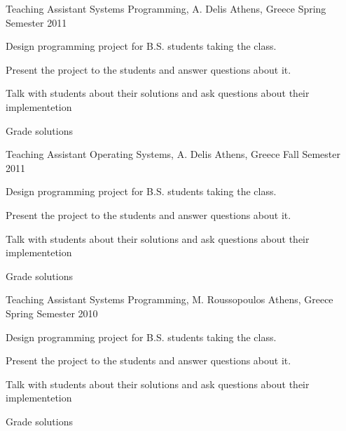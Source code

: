 

\begin{cventries}

  \cventry
    {Teaching Assistant} %
    {Systems Programming, A. Delis} %
    {Athens, Greece} %
    {Spring Semester 2011} %
    {
      \begin{cvitems} %
        \item {Design programming project for B.S. students taking the class.}
        \item {Present the project to the students and answer questions about it.}
        \item {Talk with students about their solutions and ask questions about their implementetion}
		\item {Grade solutions}
      \end{cvitems}
    }

  \cventry
    {Teaching Assistant} %
    {Operating Systems, A. Delis} %
    {Athens, Greece} %
    {Fall Semester 2011} %
    {
      \begin{cvitems} %
        \item {Design programming project for B.S. students taking the class.}
        \item {Present the project to the students and answer questions about it.}
        \item {Talk with students about their solutions and ask questions about their implementetion}
		\item {Grade solutions}
      \end{cvitems}
    }

  \cventry
    {Teaching Assistant} %
    {Systems Programming, M. Roussopoulos} %
    {Athens, Greece} %
    {Spring Semester 2010} %
    {
      \begin{cvitems} %
        \item {Design programming project for B.S. students taking the class.}
        \item {Present the project to the students and answer questions about it.}
        \item {Talk with students about their solutions and ask questions about their implementetion}
		\item {Grade solutions}
      \end{cvitems}
    }


\end{cventries}
